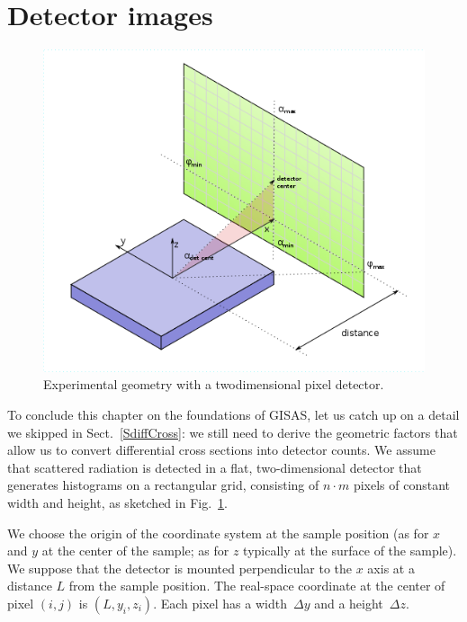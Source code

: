 \section{Detector images}\label{SdetImg}

\def\tc{\text{c}}

\begin{figure}[t]
\begin{center}
\includegraphics[width=.6\textwidth]{fig/drawing/experimental_geometry.png}
\end{center}
\caption{Experimental geometry with a twodimensional pixel detector.}
\label{FexpGeom}
\end{figure}

To conclude this chapter on the foundations of GISAS,
let us catch up on a detail we skipped in Sect.~\ref{SdiffCross}:
we still need to derive the geometric factors
that allow us to convert differential cross sections into detector counts.
We assume that scattered radiation is detected in a flat, two-dimensional detector
that generates histograms on a rectangular grid,
consisting of $n\cdot m$ pixels of constant width and height,
as sketched in Fig.~\ref{FexpGeom}.

We choose the origin of the coordinate system at the sample position
(as for $x$ and $y$ at the center of the sample;
as for $z$ typically at the surface of the sample).
We suppose that the detector is mounted perpendicular to the $x$ axis
at a distance $L$ from the sample position.
The real-space coordinate at the center of pixel $(i,j)$ is $(L,y_i,z_i)$.
Each pixel has a width~$\Delta y$ and a height~$\Delta z$.

